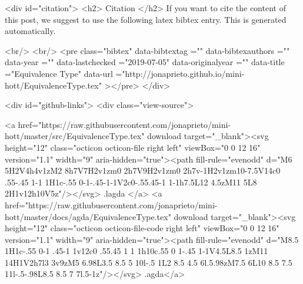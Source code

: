   
  <div id="citation">
  <h2> Citation </h2>
  If you want to cite the content of this post,
  we suggest to use the following latex bibtex entry.
  This is generated automatically.

  <br/>
  <br/>
  <pre class="bibtex"
       data-bibtextag =""
       data-bibtexauthors =""
       data-year =""
       data-lastchecked ="2019-07-05"
       data-originalyear =""
       data-title ="Equivalence Type"
       data-url ="http://jonaprieto.github.io/mini-hott/EquivalenceType.tex"
  ></pre>
  </div>
  

  <div id="github-links">
    <div class="view-source">
      
        <a href="https://raw.githubusercontent.com/jonaprieto/mini-hott/master/src/EquivalenceType.tex" download target="_blank"><svg height="12" class="octicon octicon-file right left" viewBox="0 0 12 16" version="1.1" width="9" aria-hidden="true"><path fill-rule="evenodd" d="M6 5H2V4h4v1zM2 8h7V7H2v1zm0 2h7V9H2v1zm0 2h7v-1H2v1zm10-7.5V14c0 .55-.45 1-1 1H1c-.55 0-1-.45-1-1V2c0-.55.45-1 1-1h7.5L12 4.5zM11 5L8 2H1v12h10V5z"/></svg> .lagda </a>
        <a href="https://raw.githubusercontent.com/jonaprieto/mini-hott/master/docs/agda/EquivalenceType.tex" download target="_blank"><svg height="12" class="octicon octicon-file-code right left" viewBox="0 0 12 16" version="1.1" width="9" aria-hidden="true"><path fill-rule="evenodd" d="M8.5 1H1c-.55 0-1 .45-1 1v12c0 .55.45 1 1 1h10c.55 0 1-.45 1-1V4.5L8.5 1zM11 14H1V2h7l3 3v9zM5 6.98L3.5 8.5 5 10l-.5 1L2 8.5 4.5 6l.5.98zM7.5 6L10 8.5 7.5 11l-.5-.98L8.5 8.5 7 7l.5-1z"/></svg> .agda</a>
      
